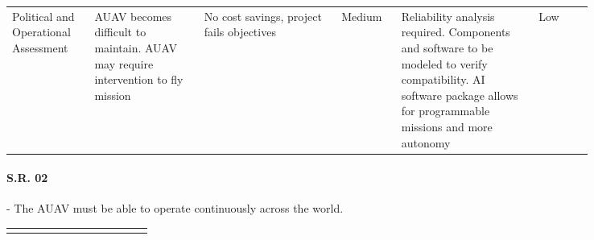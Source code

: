 \begin{fullwidth}
\begin{landscape}
{\begin{longtable}{| L{0.12\linewidth} | L{0.16\linewidth} |  L{0.20\linewidth} | L{0.08\linewidth} | L{0.20\linewidth} | L{0.08\linewidth} |}
        \hline
        Political and Operational Assessment & AUAV becomes difficult to maintain. \newline AUAV may require intervention to fly mission & No cost savings, project fails objectives &  Medium & Reliability analysis required. \newline Components and software to be modeled to verify compatibility. \newline AI software package allows for programmable missions and more autonomy &  Low
        \label{tab:sr01_feasibility}
    \end{longtable}
    }
    
    
    \paragraph{S.R. 02} - The AUAV must be able to operate continuously across the world.
    
    {\fontsize{10pt}{11pt}\selectfont
    \begin{longtable}{| L{0.12\linewidth} | L{0.16\linewidth} |  L{0.20\linewidth} | L{0.08\linewidth} | L{0.20\linewidth} | L{0.08\linewidth} |}
        \hline \endlastfoot
        

\end{longtable}}
\end{landscape}
\end{fullwidth}
